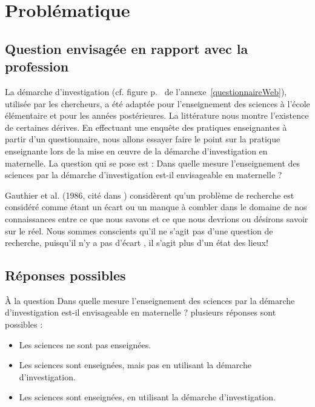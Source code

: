 \chapter{Problématique}
\section{Question envisagée en rapport avec la profession}\label{question}
La démarche d’investigation (cf. figure p.~\pageref{demarcheSci} de l’annexe~\ref{questionnaireWeb}), utilisée par les chercheurs, a été adaptée pour l’enseignement des sciences à l’école élémentaire et pour les années postérieures. La littérature nous montre l’existence de certaines dérives. En effectuant une enquête des pratiques enseignantes à partir d’un questionnaire, nous allons essayer faire le point sur la pratique enseignante lors de la mise en œuvre de la démarche d’investigation en maternelle. La question qui se pose est : \og Dans quelle mesure l’enseignement des sciences par la démarche d’investigation est-il envisageable en maternelle ? \fg{} 

Gauthier et al. (1986, cité dans ) considèrent qu’\og un problème de recherche est considéré comme étant un écart ou un manque à combler dans le domaine de nos connaissances entre ce que nous savons et ce que nous devrions ou désirons savoir sur le réel. \fg{} Nous sommes conscients qu’il ne s’agit pas d’une question de recherche, puisqu’il n’y a pas d’\og écart \fg{}, il s’agit plus d’un état des lieux!%

\section{Réponses possibles}
À la question \og Dans quelle mesure l’enseignement des sciences par la démarche d’investigation est-il envisageable en maternelle ? \fg{} plusieurs réponses sont possibles :
\begin{itemize}
\item Les sciences ne sont pas enseignées.
\item Les sciences sont enseignées, mais pas en utilisant la démarche d’investigation.
\item Les sciences sont enseignées, en utilisant la démarche d’investigation.
\end{itemize}

